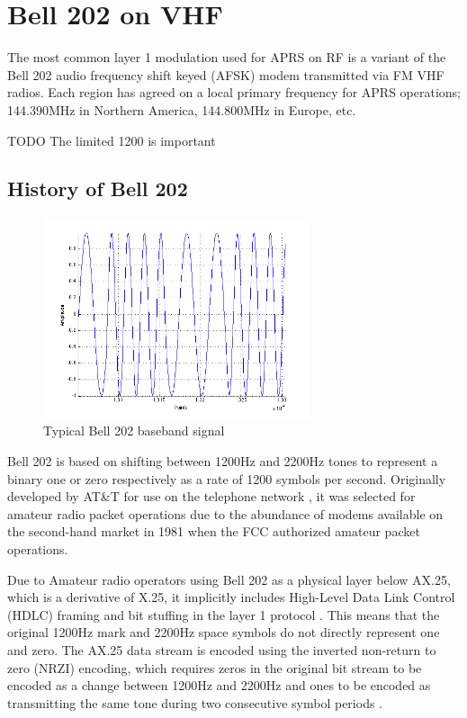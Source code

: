 \chapter{Bell 202 on VHF}

The most common layer 1 modulation used for APRS on RF is a variant of the
Bell 202 audio frequency shift keyed (AFSK) modem transmitted via 
FM VHF radios. Each region has agreed on a local primary frequency for
APRS operations; 144.390MHz in Northern America, 144.800MHz in Europe, etc.

TODO The limited 1200 is important

\section{History of Bell 202}
\label{sec:bell202history}

\begin{figure}
	\centering
	\includegraphics[width=0.7\textwidth]{src/bell202sample}
	\caption{Typical Bell 202 baseband signal}
	\label{fig:bell202sample}
\end{figure}

Bell 202 is based on shifting between 1200Hz and 2200Hz tones to
represent a binary one or zero respectively as a rate of 
1200 symbols per second.
Originally developed by AT\&T for use on the telephone network \cite{202tspec},
it was selected for amateur radio packet operations due to the abundance
of modems available on the second-hand market in 1981 when the FCC authorized
amateur packet operations.

Due to Amateur radio operators
using Bell 202 as a physical layer below AX.25, which is a derivative of
X.25, it implicitly includes High-Level Data Link Control (HDLC) 
framing and bit stuffing in the layer 1 protocol \cite{n1vgphy}.
This means that the original 1200Hz mark and 2200Hz space symbols
do not directly represent one and zero.
The AX.25 data stream is encoded using the 
inverted non-return to zero (NRZI) encoding,
which requires zeros in the original bit stream to be encoded as a change
between 1200Hz and 2200Hz and ones to be encoded as transmitting the same
tone during two consecutive symbol periods \cite{iso13239}.

